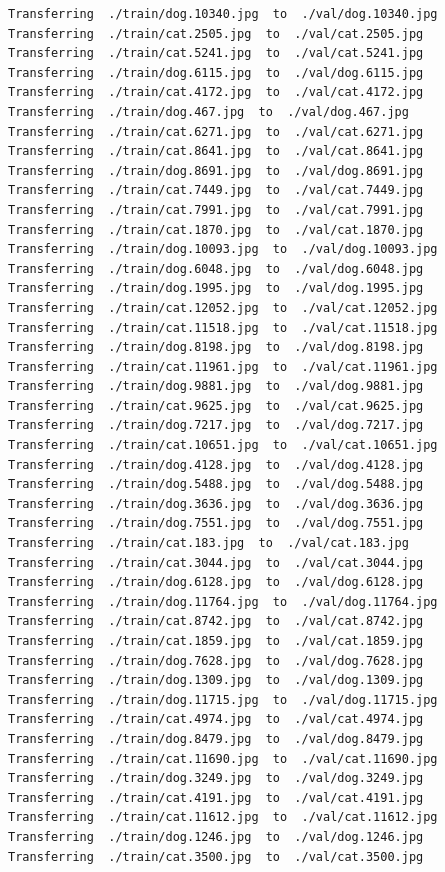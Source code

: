\documentclass[]{book}
\theoremstyle{definition}
\theoremstyle{definition}
\theoremstyle{definition}
\theoremstyle{remark}
\begin{document}
\begin{verbatim}
Transferring  ./train/dog.10340.jpg  to  ./val/dog.10340.jpg
Transferring  ./train/cat.2505.jpg  to  ./val/cat.2505.jpg
Transferring  ./train/cat.5241.jpg  to  ./val/cat.5241.jpg
Transferring  ./train/dog.6115.jpg  to  ./val/dog.6115.jpg
Transferring  ./train/cat.4172.jpg  to  ./val/cat.4172.jpg
Transferring  ./train/dog.467.jpg  to  ./val/dog.467.jpg
Transferring  ./train/cat.6271.jpg  to  ./val/cat.6271.jpg
Transferring  ./train/cat.8641.jpg  to  ./val/cat.8641.jpg
Transferring  ./train/dog.8691.jpg  to  ./val/dog.8691.jpg
Transferring  ./train/cat.7449.jpg  to  ./val/cat.7449.jpg
Transferring  ./train/cat.7991.jpg  to  ./val/cat.7991.jpg
Transferring  ./train/cat.1870.jpg  to  ./val/cat.1870.jpg
Transferring  ./train/dog.10093.jpg  to  ./val/dog.10093.jpg
Transferring  ./train/dog.6048.jpg  to  ./val/dog.6048.jpg
Transferring  ./train/dog.1995.jpg  to  ./val/dog.1995.jpg
Transferring  ./train/cat.12052.jpg  to  ./val/cat.12052.jpg
Transferring  ./train/cat.11518.jpg  to  ./val/cat.11518.jpg
Transferring  ./train/dog.8198.jpg  to  ./val/dog.8198.jpg
Transferring  ./train/cat.11961.jpg  to  ./val/cat.11961.jpg
Transferring  ./train/dog.9881.jpg  to  ./val/dog.9881.jpg
Transferring  ./train/cat.9625.jpg  to  ./val/cat.9625.jpg
Transferring  ./train/dog.7217.jpg  to  ./val/dog.7217.jpg
Transferring  ./train/cat.10651.jpg  to  ./val/cat.10651.jpg
Transferring  ./train/dog.4128.jpg  to  ./val/dog.4128.jpg
Transferring  ./train/dog.5488.jpg  to  ./val/dog.5488.jpg
Transferring  ./train/dog.3636.jpg  to  ./val/dog.3636.jpg
Transferring  ./train/dog.7551.jpg  to  ./val/dog.7551.jpg
Transferring  ./train/cat.183.jpg  to  ./val/cat.183.jpg
Transferring  ./train/cat.3044.jpg  to  ./val/cat.3044.jpg
Transferring  ./train/dog.6128.jpg  to  ./val/dog.6128.jpg
Transferring  ./train/dog.11764.jpg  to  ./val/dog.11764.jpg
Transferring  ./train/cat.8742.jpg  to  ./val/cat.8742.jpg
Transferring  ./train/cat.1859.jpg  to  ./val/cat.1859.jpg
Transferring  ./train/dog.7628.jpg  to  ./val/dog.7628.jpg
Transferring  ./train/dog.1309.jpg  to  ./val/dog.1309.jpg
Transferring  ./train/dog.11715.jpg  to  ./val/dog.11715.jpg
Transferring  ./train/cat.4974.jpg  to  ./val/cat.4974.jpg
Transferring  ./train/dog.8479.jpg  to  ./val/dog.8479.jpg
Transferring  ./train/cat.11690.jpg  to  ./val/cat.11690.jpg
Transferring  ./train/dog.3249.jpg  to  ./val/dog.3249.jpg
Transferring  ./train/cat.4191.jpg  to  ./val/cat.4191.jpg
Transferring  ./train/cat.11612.jpg  to  ./val/cat.11612.jpg
Transferring  ./train/dog.1246.jpg  to  ./val/dog.1246.jpg
Transferring  ./train/cat.3500.jpg  to  ./val/cat.3500.jpg

\end{verbatim}
\end{document}
